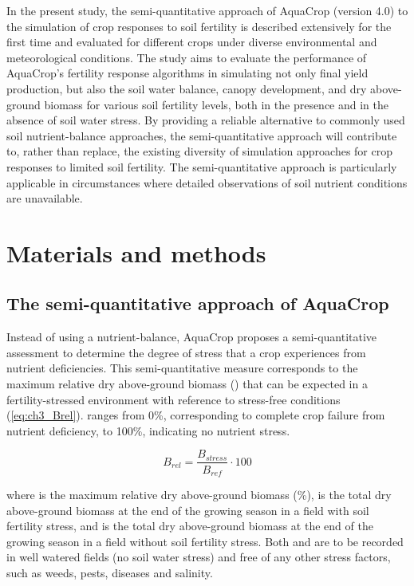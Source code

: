 In the present study, the semi-quantitative approach of AquaCrop (version 4.0) to the simulation of crop responses to soil fertility is described extensively for the first time and evaluated for different crops under diverse environmental and meteorological conditions. The study aims to evaluate the performance of AquaCrop's fertility response algorithms in simulating not only final yield production, but also the soil water balance, canopy development, and dry above-ground biomass for various soil fertility levels, both in the presence and in the absence of soil water stress. By providing a reliable alternative to commonly used soil nutrient-balance approaches, the semi-quantitative approach will contribute to, rather than replace, the existing diversity of simulation approaches for crop responses to limited soil fertility. The semi-quantitative approach is particularly applicable in circumstances where detailed observations of soil nutrient conditions are unavailable. 

\section{Materials and methods}
\subsection{The semi-quantitative approach of AquaCrop}
Instead of using a nutrient-balance, AquaCrop proposes a semi-quantitative assessment to determine the degree of stress that a crop experiences from nutrient deficiencies. This semi-quantitative measure corresponds to the maximum relative dry above-ground biomass (\Brel) that can be expected in a fertility-stressed environment with reference to stress-free conditions (\autoref{eq:ch3_Brel}). \Brel ranges from 0\%, corresponding to complete crop failure from nutrient deficiency, to 100\%, indicating no nutrient stress.

\begin{equation}
 B_{rel}=\frac{B_{stress}}{B_{ref}}\cdot 100
 \label{eq:ch3_Brel}
\end{equation}

where \Brel is the maximum relative dry above-ground biomass (\%), \Bstress is the total dry above-ground biomass at the end of the growing season in a field with soil fertility stress, and \Bref is the total dry above-ground biomass at the end of the growing season in a field without soil fertility stress. Both \Bstress and \Bref are to be recorded in well watered fields (no soil water stress) and free of any other stress factors, such as weeds, pests, diseases and salinity.

